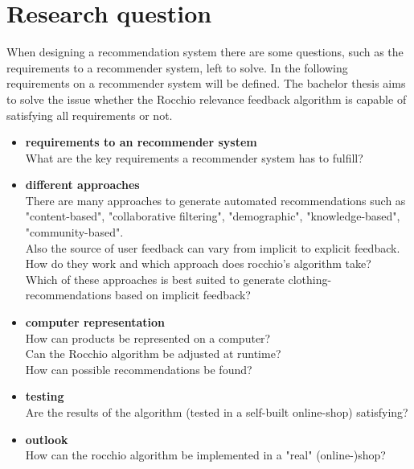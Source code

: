 

\section{Research question}
When designing a recommendation system there are some questions, such as the requirements to a recommender system, left to solve.
In the following requirements on a recommender system will be defined.
The bachelor thesis aims to solve the issue whether the Rocchio relevance feedback algorithm is capable of satisfying all requirements or not.

\begin{itemize}
    \item \textbf{requirements to an recommender system}\\
        What are the key requirements a recommender system has to fulfill?

    \item \textbf{different approaches}\\
        There are many approaches to generate automated recommendations such as "content-based", "collaborative filtering", "demographic", "knowledge-based", "community-based".\citep[p.~10-12]{ricci:11}\\
        Also the source of user feedback can vary from implicit to explicit feedback.\citep[p. 76]{lops:11}\\
        How do they work and which approach does rocchio's algorithm take?\\
        Which of these approaches is best suited to generate clothing-recommendations based on implicit feedback?

    \item \textbf{computer representation}\\
        How can products be represented on a computer?\\
        Can the Rocchio algorithm be adjusted at runtime?\\
        How can possible recommendations be found?

    \item \textbf{testing}\\
        Are the results of the algorithm (tested in a self-built online-shop) satisfying?

    \item \textbf{outlook}\\
        How can the rocchio algorithm be implemented in a "real" (online-)shop?
        
\end{itemize}






